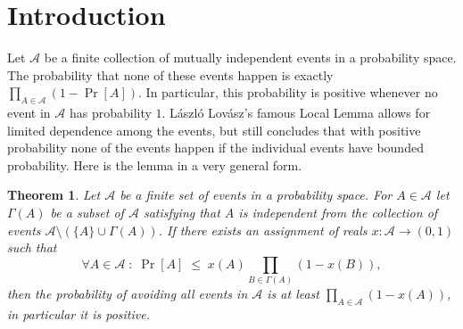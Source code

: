 \documentclass[11pt,a4paper]{article}
\newtheorem{theorem}{Theorem}[section]
\DeclareMathOperator*{\pr}{Pr}
\begin{document}
\section{Introduction}

Let $\mathcal A$ be a finite collection of mutually independent events in a
probability space. The probability that none of these events happen is exactly
$\prod_{A\in\mathcal A}(1-\pr[A])$. In particular, this probability is
positive whenever no event in $\mathcal A$ has probability $1$. L\'aszl\'o
Lov\'asz's famous Local Lemma \cite{EL75} allows for limited dependence
among the events, but still concludes that with positive probability
none of the events happen if the individual events have bounded
probability. Here is the lemma in a very general form.

\begin{theorem}\label{lovasz}
{\bf \cite{EL75}}
Let $\mathcal A$ be a finite set of events in a probability space. For
$A\in\mathcal A$ let $\Gamma(A)$ be a subset of $\mathcal A$ satisfying that
$A$ is independent from the collection of events $\mathcal
A\setminus(\{A\}\cup\Gamma(A))$. If there exists an
assignment of reals $x : \mathcal{A} \rightarrow (0,1)$ such that
$$ \forall A \in \mathcal{A} \; : \; \pr[A] \; \le \; x(A) \prod_{B \in
\Gamma(A)} (1 - x(B)),$$
then the probability of avoiding all events in $\mathcal A$ is at least
$\prod_{A\in\mathcal A}(1-x(A))$, in particular it is positive.
\end{theorem}
\end{document}
